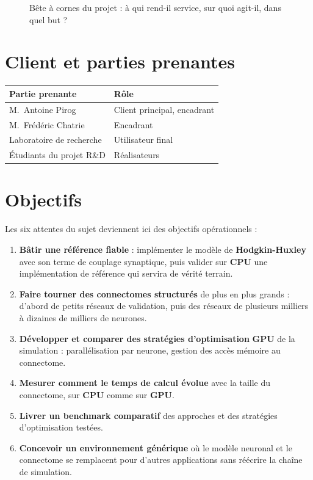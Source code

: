 \documentclass{report}
\begin{document}
\begin{figure}[!htbp]
{}%
\caption{Bête à cornes du projet : à qui rend-il service, sur quoi agit-il, dans quel but ?}
\end{figure}

\chapter{Client et parties prenantes}

\begin{longtable}{|p{4.6cm}|p{10cm}|}
\hline
\textbf{Partie prenante} & \textbf{Rôle} \\ \hline
M.~Antoine Pirog & Client principal, encadrant \\ \hline
M.~Frédéric Chatrie & Encadrant \\ \hline
Laboratoire de recherche & Utilisateur final \\ \hline
Étudiants du projet R\&D & Réalisateurs \\ \hline
\end{longtable}

\chapter{Objectifs}

Les six attentes du sujet deviennent ici des objectifs opérationnels :

\begin{enumerate}
    \item \textbf{Bâtir une référence fiable} : implémenter le modèle de \textbf{Hodgkin-Huxley} avec son terme de couplage synaptique, puis valider sur \textbf{CPU} une implémentation de référence qui servira de vérité terrain.
    \item \textbf{Faire tourner des connectomes structurés} de plus en plus grands : d'abord de petits réseaux de validation, puis des réseaux de plusieurs milliers à dizaines de milliers de neurones.
    \item \textbf{Développer et comparer des stratégies d'optimisation} \textbf{GPU} de la simulation : parallélisation par neurone, gestion des accès mémoire au connectome.
    \item \textbf{Mesurer comment le temps de calcul évolue} avec la taille du connectome, sur \textbf{CPU} comme sur \textbf{GPU}.
    \item \textbf{Livrer un benchmark comparatif} des approches et des stratégies d'optimisation testées.
    \item \textbf{Concevoir un environnement générique} où le modèle neuronal et le connectome se remplacent pour d'autres applications sans réécrire la chaîne de simulation.
\end{enumerate}
\end{document}
